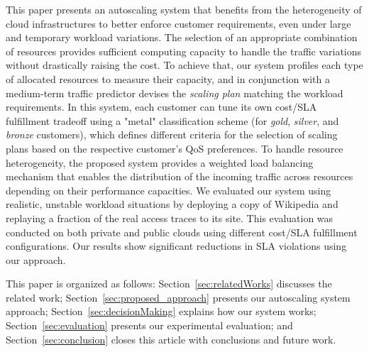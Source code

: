This paper presents an autoscaling system that benefits from the
heterogeneity of cloud infrastructures to better enforce customer
requirements, even under large and temporary workload variations. The
selection of an appropriate combination of resources provides sufficient
computing capacity to handle the traffic variations without
drastically raising the cost. To achieve that, our system profiles
each type of allocated resources to measure their capacity, and in
conjunction with a medium-term traffic predictor devises
the \emph{scaling plan} matching the workload
requirements. In this system, each customer can tune its own cost/SLA
fulfillment tradeoff using a "metal" classification scheme (for {\em gold}, {\em silver}, 
and {\em bronze} customers), which
defines different criteria for the selection of scaling plans
based on the respective customer's QoS preferences. To handle resource heterogeneity,
the proposed system provides a weighted load balancing mechanism that
enables the distribution of the incoming traffic across resources depending
on their performance capacities. We evaluated our system using realistic,
unstable workload situations by deploying a copy of Wikipedia and
replaying a fraction of the real access traces to its 
site. This evaluation was conducted on both private and public clouds
using different cost/SLA fulfillment configurations. Our results show significant
reductions in SLA violations using our approach.

This paper is organized as follows: Section~\ref{sec:relatedWorks} discusses
the related work; Section~\ref{sec:proposed_approach} presents our
autoscaling system approach; Section~\ref{sec:decisionMaking} explains
how our system works; Section~\ref{sec:evaluation} presents
our experimental evaluation; and Section~\ref{sec:conclusion} closes this article with conclusions and future work.
